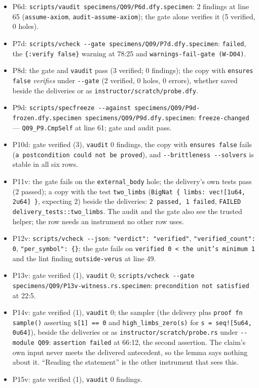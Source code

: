 \documentclass[11pt]{article}
\begin{document}
\begin{itemize}
\item P6d: \texttt{scripts/vaudit specimens/Q09/P6d.dfy.specimen}: 2 findings
  at line 65 (\texttt{assume-axiom}, \texttt{audit-assume-axiom}); the gate
  alone verifies it (5 verified, 0 holes).
\item P7d: \texttt{scripts/vcheck -{}-gate specimens/Q09/P7d.dfy.specimen}:
  \texttt{failed}, the \texttt{\{:verify false\}} warning at 78:25 and
  \texttt{warnings-fail-gate (W-D04)}.
\item P8d: the gate and \texttt{vaudit} pass (3 verified; 0 findings); the copy
  with \texttt{ensures false} \emph{verifies} under \texttt{-{}-gate} (2
  verified, 0 holes, 0 errors), whether saved beside the deliveries or as
  \texttt{instructor/scratch/probe.dfy}.
\item P9d: \texttt{scripts/specfreeze -{}-against
  specimens/Q09/P9d-frozen.dfy.specimen specimens/Q09/P9d.dfy.specimen}:
  \texttt{freeze-changed} --- \texttt{Q09\_P9.CmpSelf} at line 61; gate and audit pass.
\item P10d: gate verified (3), \texttt{vaudit} 0 findings, the copy with
  \texttt{ensures false} fails (\texttt{a postcondition could not be
  proved}), and \texttt{-{}-brittleness -{}-solvers} is stable in all six rows.
\item P11v: the gate fails on the \texttt{external\_body} hole; the delivery's
  own tests pass (2 passed); a copy with the test \texttt{two\_limbs}
  (\texttt{BigNat \{ limbs: vec![1u64, 2u64] \}}, expecting 2) beside the
  deliveries: \texttt{2 passed, 1 failed}, \texttt{FAILED
  delivery\_tests::two\_limbs}. The audit and the gate also see the trusted
  helper; the row needs an instrument no other row uses.
\item P12v: \texttt{scripts/vcheck -{}-json}: \texttt{"verdict": "verified"},
  \texttt{"verified\_count": 0}, \texttt{"per\_symbol": \{\}}; the gate fails
  on \texttt{verified 0 < the unit's minimum 1} and the lint finding
  \texttt{outside-verus} at line 49.
\item P13v: gate verified (1), \texttt{vaudit} 0; \texttt{scripts/vcheck -{}-gate
  specimens/Q09/P13v-witness.rs.specimen}: \texttt{precondition not
  satisfied} at 22:5.
\item P14v: gate verified (1), \texttt{vaudit} 0; the sampler (the delivery
  plus \texttt{proof fn sample()} asserting \texttt{s[1] == 0} and
  \texttt{high\_limbs\_zero(s)} for \texttt{s = seq![5u64, 0u64]}), beside the
  deliveries or as \texttt{instructor/scratch/probe.rs} under \texttt{-{}-module
  Q09}: \texttt{assertion failed} at 66:12, the second assertion. The claim's
  own input never meets the delivered antecedent, so the lemma says nothing
  about it. ``Reading the statement'' is the other instrument that sees this.
\item P15v: gate verified (1), \texttt{vaudit} 0 findings.
\end{itemize}
\end{document}
